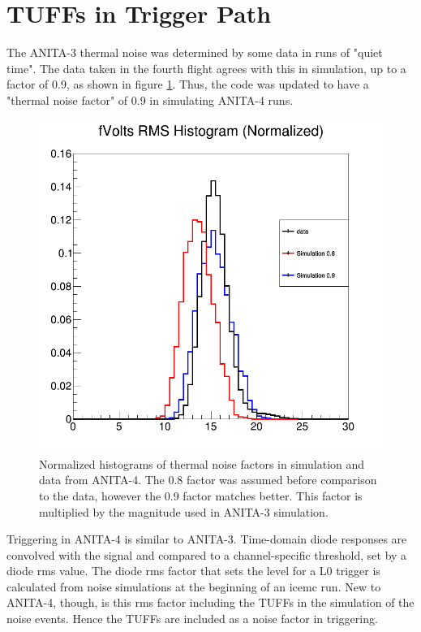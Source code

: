 \documentclass[12pt]{article}
\theoremstyle{plain}
\theoremstyle{definition}
\begin{document}
\section{TUFFs in Trigger Path}
\hspace{0.2in} 
The ANITA-3 thermal noise was determined by some data in runs of "quiet time". The data taken in the fourth flight agrees with this in simulation, up to a factor of 0.9, as shown in figure \ref{fig:thermal_noise}. Thus, the code was updated to have a "thermal noise factor" of 0.9 in simulating ANITA-4 runs.
\begin{figure}
	\centering
	\includegraphics[scale=0.35]{"thermal_noise_hits_plotting/RMS_fVolts_rms_only_antennas"}
	\caption{Normalized histograms of thermal noise factors in simulation and data from ANITA-4. The 0.8 factor was assumed before comparison to the data, however the 0.9 factor matches better. This factor is multiplied by the magnitude used in ANITA-3 simulation. }
	    \label{fig:thermal_noise}
\end{figure}

Triggering in ANITA-4 is similar to ANITA-3. Time-domain diode responses are convolved with the signal and compared to a channel-specific threshold, set by a diode rms value. The diode rms factor that sets the level for a L0 trigger is calculated from noise simulations at the beginning of an icemc run. New to ANITA-4, though, is this rms factor including the TUFFs in the simulation of the noise events. Hence the TUFFs are included as a noise 
factor in triggering. 
\end{document}
